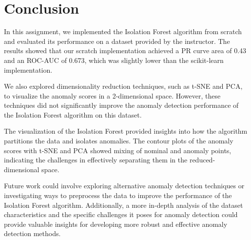 
\section{Conclusion}
In this assignment, we implemented the Isolation Forest algorithm from scratch and evaluated its performance on a dataset provided by the instructor. The results showed that our scratch implementation achieved a PR curve area of 0.43 and an ROC-AUC of 0.673, which was slightly lower than the scikit-learn implementation.

We also explored dimensionality reduction techniques, such as t-SNE and PCA, to visualize the anomaly scores in a 2-dimensional space. However, these techniques did not significantly improve the anomaly detection performance of the Isolation Forest algorithm on this dataset.

The visualization of the Isolation Forest provided insights into how the algorithm partitions the data and isolates anomalies. The contour plots of the anomaly scores with t-SNE and PCA showed mixing of nominal and anomaly points, indicating the challenges in effectively separating them in the reduced-dimensional space.

Future work could involve exploring alternative anomaly detection techniques or investigating ways to preprocess the data to improve the performance of the Isolation Forest algorithm. Additionally, a more in-depth analysis of the dataset characteristics and the specific challenges it poses for anomaly detection could provide valuable insights for developing more robust and effective anomaly detection methods.
